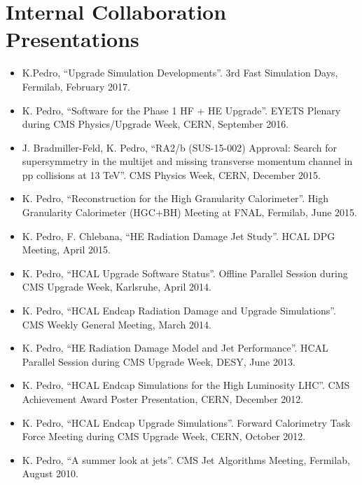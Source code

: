 \ifdefined\longerflag
\section{Internal Collaboration Presentations}
\begin{itemize}[leftmargin=12pt]
\item K.Pedro, ``Upgrade Simulation Developments''. 3rd Fast Simulation Days, Fermilab, February 2017.
\item K. Pedro, ``Software for the Phase 1 HF + HE Upgrade''. EYETS Plenary during CMS Physics/Upgrade Week, CERN, September 2016.
\item J. Bradmiller-Feld, K. Pedro, ``RA2/b (SUS-15-002) Approval: Search for supersymmetry in the multijet and missing transverse momentum channel in pp collisions at 13 TeV''. CMS Physics Week, CERN, December 2015.
\item K. Pedro, ``Reconstruction for the High Granularity Calorimeter''. High Granularity Calorimeter (HGC+BH) Meeting at FNAL, Fermilab, June 2015.
\item K. Pedro, F. Chlebana, ``HE Radiation Damage Jet Study''. HCAL DPG Meeting, April 2015.
\item K. Pedro, ``HCAL Upgrade Software Status''. Offline Parallel Session during CMS Upgrade Week, Karlsruhe, April 2014.
\item K. Pedro, ``HCAL Endcap Radiation Damage and Upgrade Simulations''. CMS Weekly General Meeting, March 2014.
\item K. Pedro, ``HE Radiation Damage Model and Jet Performance''. HCAL Parallel Session during CMS Upgrade Week, DESY, June 2013.
\item K. Pedro, ``HCAL Endcap Simulations for the High Luminosity LHC''. CMS Achievement Award Poster Presentation, CERN, December 2012.
\item K. Pedro, ``HCAL Endcap Upgrade Simulations''. Forward Calorimetry Task Force Meeting during CMS Upgrade Week, CERN, October 2012.
\item K. Pedro, ``A summer look at jets''. CMS Jet Algorithms Meeting, Fermilab, August 2010.
\end{itemize}
\fi